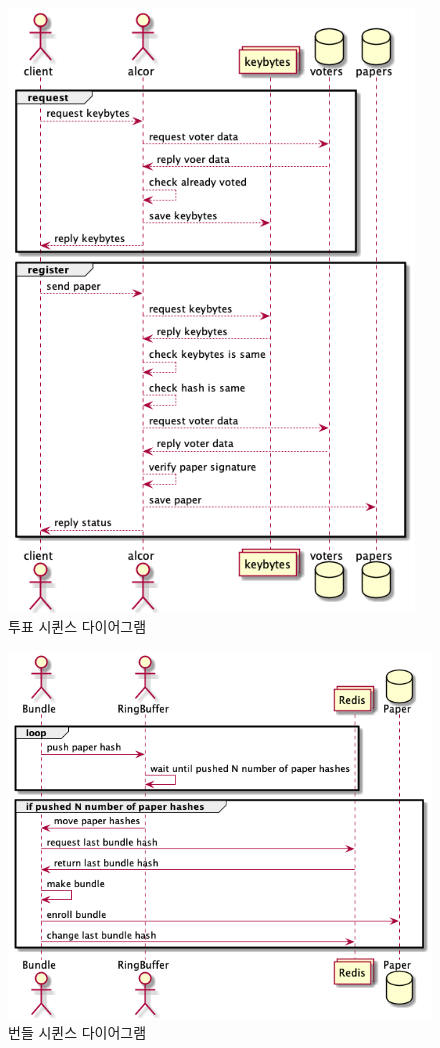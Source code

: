 \documentclass[8pt,a4paper,left=8mm,right=8mm,top=10mm,bottom=10mm]{article}
\begin{document}
    \begin{figure}[h]
        \begin{center}
            \includegraphics[height=16cm]{vote}
            \caption{투표 시퀸스 다이어그램}
        \end{center}
    \end{figure}

    \begin{figure}[h]
        \begin{center}
            \includegraphics[width=15cm]{bundle-seq}
            \caption{번들 시퀸스 다이어그램}
        \end{center}
    \end{figure}
\end{document}

